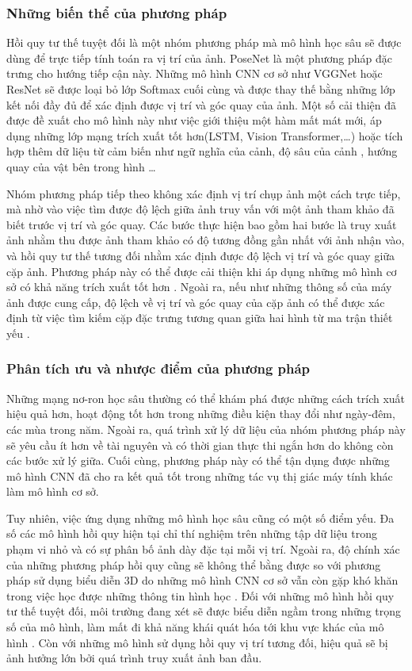 \subsubsection*{Những biến thể của phương pháp}

Hồi quy tư thế tuyệt đối là một nhóm phương pháp mà mô hình học sâu sẽ được dùng để trực tiếp tính toán ra vị trí của ảnh. PoseNet \cite{kendall2016posenet} là một phương pháp đặc trưng cho hướng tiếp cận này. Những mô hình CNN cơ sở như VGGNet hoặc ResNet sẽ được loại bỏ lớp Softmax cuối cùng và được thay thế bằng những lớp kết nối đầy đủ để xác định được vị trí và góc quay của ảnh. Một số cải thiện đã được đề xuất cho mô hình này như việc giới thiệu một hàm mất mát mới, áp dụng những lớp mạng trích xuất tốt hơn(LSTM, Vision Transformer,\dots) \cite{keetha2023anyloc} hoặc tích hợp thêm dữ liệu từ cảm biến như ngữ nghĩa của cảnh, độ sâu của cảnh \cite{yan2022crossloc}, hướng quay của vật bên trong hình \cite{liu2019lending} \dots

Nhóm phương pháp tiếp theo không xác định vị trí chụp ảnh một cách trực tiếp, mà nhờ vào việc tìm được độ lệch giữa ảnh truy vấn với một ảnh tham khảo đã biết trước vị trí và góc quay. Các bước thực hiện bao gồm hai bước là truy xuất ảnh nhằm thu được ảnh tham khảo có độ tương đồng gần nhất với ảnh nhận vào, và hồi quy tư thế tương đối nhằm xác định được độ lệch vị trí và góc quay giữa cặp ảnh. Phương pháp này có thể được cải thiện khi áp dụng những mô hình cơ sở có khả năng trích xuất tốt hơn \cite{shavit2023coarse}. Ngoài ra, nếu như những thông số của máy ảnh được cung cấp, độ lệch về vị trí và góc quay của cặp ảnh có thể được xác định từ việc tìm kiếm cặp đặc trưng tương quan giữa hai hình từ ma trận thiết yếu \cite{zhou2020learn}.

\subsubsection*{Phân tích ưu và nhược điểm của phương pháp}
Những mạng nơ-ron học sâu thường có thể khám phá được những cách trích xuất hiệu quả hơn, hoạt động tốt hơn trong những điều kiện thay đổi như ngày-đêm, các mùa trong năm. Ngoài ra, quá trình xử lý dữ liệu của nhóm phương pháp này sẽ yêu cầu ít hơn về tài nguyên và có thời gian thực thi ngắn hơn do không còn các bước xử lý giữa. Cuối cùng, phương pháp này có thể tận dụng được những mô hình CNN đã cho ra kết quả tốt trong những tác vụ thị giác máy tính khác làm mô hình cơ sở.

Tuy nhiên, việc ứng dụng những mô hình học sâu cũng có một số điểm yếu. Đa số các mô hình hồi quy hiện tại chỉ thí nghiệm trên những tập dữ liệu trong phạm vi nhỏ và có sự phân bố ảnh dày đặc tại mỗi vị trí. Ngoài ra, độ chính xác của những phương pháp hồi quy cũng sẽ không thể bằng được so với phương pháp sử dụng biểu diễn 3D do những mô hình CNN cơ sở vẫn còn gặp khó khăn trong việc học được những thông tin hình học \cite{zhou2020learn}. Đối với những mô hình hồi quy tư thế tuyệt đối, môi trường đang xét sẽ được biểu diễn ngầm trong những trọng số của mô hình, làm mất đi khả năng khái quát hóa tới khu vực khác của mô hình \cite{sattler2019understanding}. Còn với những mô hình sử dụng hồi quy vị trí tương đối, hiệu quả sẽ bị ảnh hưởng lớn bởi quá trình truy xuất ảnh ban đầu.

